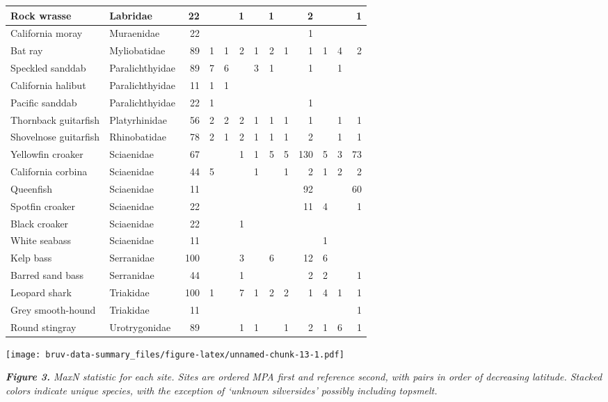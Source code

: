 \documentclass[]{article}
\begin{document}
\begin{table}[H]
\begin{tabular}{l|l|r|r|r|r|r|r|r|r|r|r|r}
\hline
Rock wrasse & Labridae & 22 &  &  & 1 &  & 1 &  & 2 &  &  & 1\\
\hline
California moray & Muraenidae & 22 &  &  &  &  &  &  & 1 &  &  & \\
\hline
Bat ray & Myliobatidae & 89 & 1 & 1 & 2 & 1 & 2 & 1 & 1 & 1 & 4 & 2\\
\hline
Speckled sanddab & Paralichthyidae & 89 & 7 & 6 &  & 3 & 1 &  & 1 &  & 1 & \\
\hline
California halibut & Paralichthyidae & 11 & 1 & 1 &  &  &  &  &  &  &  & \\
\hline
Pacific sanddab & Paralichthyidae & 22 & 1 &  &  &  &  &  & 1 &  &  & \\
\hline
Thornback guitarfish & Platyrhinidae & 56 & 2 & 2 & 2 & 1 & 1 & 1 & 1 &  & 1 & 1\\
\hline
Shovelnose guitarfish & Rhinobatidae & 78 & 2 & 1 & 2 & 1 & 1 & 1 & 2 &  & 1 & 1\\
\hline
Yellowfin croaker & Sciaenidae & 67 &  &  & 1 & 1 & 5 & 5 & 130 & 5 & 3 & 73\\
\hline
California corbina & Sciaenidae & 44 & 5 &  &  & 1 &  & 1 & 2 & 1 & 2 & 2\\
\hline
Queenfish & Sciaenidae & 11 &  &  &  &  &  &  & 92 &  &  & 60\\
\hline
Spotfin croaker & Sciaenidae & 22 &  &  &  &  &  &  & 11 & 4 &  & 1\\
\hline
Black croaker & Sciaenidae & 22 &  &  & 1 &  &  &  &  &  &  & \\
\hline
White seabass & Sciaenidae & 11 &  &  &  &  &  &  &  & 1 &  & \\
\hline
Kelp bass & Serranidae & 100 &  &  & 3 &  & 6 &  & 12 & 6 &  & \\
\hline
Barred sand bass & Serranidae & 44 &  &  & 1 &  &  &  & 2 & 2 &  & 1\\
\hline
Leopard shark & Triakidae & 100 & 1 &  & 7 & 1 & 2 & 2 & 1 & 4 & 1 & 1\\
\hline
Grey smooth-hound & Triakidae & 11 &  &  &  &  &  &  &  &  &  & 1\\
\hline
Round stingray & Urotrygonidae & 89 &  &  & 1 & 1 &  & 1 & 2 & 1 & 6 & 1\\
\hline
\end{tabular}
\end{table}

\texttt{[image: bruv-data-summary\_files/figure-latex/unnamed-chunk-13-1.pdf]}

\emph{\textbf{Figure 3.} MaxN statistic for each site. Sites are ordered
MPA first and reference second, with pairs in order of decreasing
latitude. Stacked colors indicate unique species, with the exception of
`unknown silversides' possibly including topsmelt.}
\end{document}

